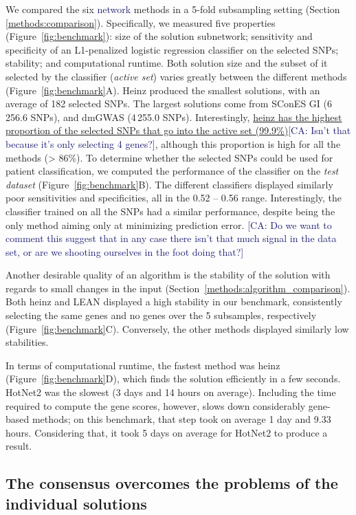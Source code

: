 \documentclass[twocolumn, 11pt]{article}
\newcommand{\cazcom}[2]{{\uline{#1}}\unskip\space\textcolor{MidnightBlue}{[CA: #2]}}
\newcommand{\caz}[2]{{\sout{#1}}\unskip\space\textcolor{MidnightBlue}{#2}}
\begin{document}
We compared the six \caz{}{network} methods in a 5-fold subsampling setting (Section \ref{methods:comparison}). Specifically, we measured five properties (Figure~\ref{fig:benchmark}): size of the solution subnetwork; sensitivity and specificity of an L1-penalized logistic regression classifier on the selected SNPs; stability; and computational runtime. Both solution size and the subset of it selected by the classifier (\emph{active set}) varies greatly between the different methods (Figure~\ref{fig:benchmark}A). Heinz produced the smallest solutions, with an average of 182 selected SNPs. The largest solutions come from SConES GI (6\,256.6 SNPs), and dmGWAS (4\,255.0 SNPs). Interestingly, \cazcom{heinz has the highest proportion of the selected SNPs that go into the active set (99.9\%)}{Isn't that because it's only selecting 4 genes?}, although this proportion is high for all the methods (> 86\%). To determine whether the selected SNPs could be used for patient classification, we computed the performance of the classifier on the \emph{test dataset} (Figure~\ref{fig:benchmark}B). The different classifiers displayed similarly poor sensitivities and specificities, all in the 0.52 -- 0.56 range. Interestingly, the classifier trained on all the SNPs had a similar performance, despite being the only method aiming only at minimizing prediction error. \cazcom{}{Do we want to comment this suggest that in any case there isn't that much signal in the data set, or are we shooting ourselves in the foot doing that?}

Another desirable quality of an algorithm is the stability of the solution with regards to small changes in the input (Section~\ref{methods:algorithm_comparison}). Both heinz and LEAN displayed a high stability in our benchmark, consistently selecting the same genes and no genes over the 5 subsamples, respectively (Figure~\ref{fig:benchmark}C). Conversely, the other methods displayed similarly low stabilities. 

In terms of computational runtime, the fastest method was heinz (Figure~\ref{fig:benchmark}D), which finds the solution efficiently in a few seconds. HotNet2 was the slowest (3 days and 14 hours on average). Including the time required to compute the gene scores, however, slows down considerably gene-based methods; on this benchmark, that step took on average 1 day and 9.33 hours. Considering that, it took 5 days on average for HotNet2 to produce a result.

\subsection{The consensus overcomes the problems of the individual solutions}
\label{results:drawbacks}
\end{document}
